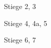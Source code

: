 \documentclass[a4paper]{article}
\begin{document}
\printVSLEventHeader{}{}
\begin{vsltext}{3cm}{3.5cm}
    \Stair{2cm} Stiege 2, 3

    \vspace{1cm}

    \Stair{2cm} Stiege 4, 4a, 5

    \vspace{1cm}

    \Stair{2cm} Stiege 6, 7

\end{vsltext}
\end{document}
